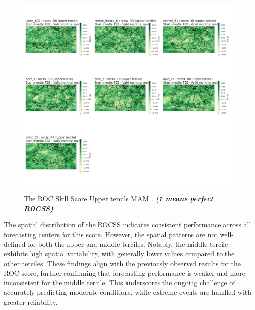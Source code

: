 \begin{figure}[H]
    \centering
    \includegraphics[scale=0.3]{plots/prob/rocss/rocss_mam_RR_upper.png}
    \caption{The ROC Skill Score Upper tercile MAM    . \textbf{\textit{(1 means perfect ROCSS)}}}
\end{figure}


The spatial distribution of the ROCSS indicates consistent performance across all forecasting centers for this score. However, the spatial patterns are not well-defined for both the upper and middle terciles. Notably, the middle tercile exhibits high spatial variability, with generally lower values compared to the other terciles. These findings align with the previously observed results for the ROC score, further confirming that forecasting performance is weaker and more inconsistent for the middle tercile. This underscores the ongoing challenge of accurately predicting moderate conditions, while extreme events are handled with greater reliability.



